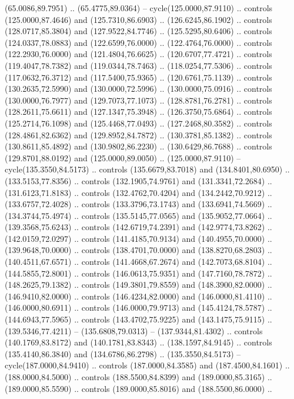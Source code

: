   (65.0086,89.7951) .. (65.4775,89.0364) -- cycle(125.0000,87.9110) .. controls
  (125.0000,87.4646) and (125.7310,86.6903) .. (126.6245,86.1902) .. controls
  (128.0717,85.3804) and (127.9522,84.7746) .. (125.5295,80.6406) .. controls
  (124.0337,78.0883) and (122.6599,76.0000) .. (122.4764,76.0000) .. controls
  (122.2930,76.0000) and (121.4804,76.6625) .. (120.6707,77.4721) .. controls
  (119.4047,78.7382) and (119.0344,78.7463) .. (118.0254,77.5306) .. controls
  (117.0632,76.3712) and (117.5400,75.9365) .. (120.6761,75.1139) .. controls
  (130.2635,72.5990) and (130.0000,72.5996) .. (130.0000,75.0916) .. controls
  (130.0000,76.7977) and (129.7073,77.1073) .. (128.8781,76.2781) .. controls
  (128.2611,75.6611) and (127.1347,75.3948) .. (126.3750,75.6864) .. controls
  (125.2714,76.1098) and (125.4468,77.0493) .. (127.2468,80.3582) .. controls
  (128.4861,82.6362) and (129.8952,84.7872) .. (130.3781,85.1382) .. controls
  (130.8611,85.4892) and (130.9802,86.2230) .. (130.6429,86.7688) .. controls
  (129.8701,88.0192) and (125.0000,89.0050) .. (125.0000,87.9110) --
  cycle(135.3550,84.5173) .. controls (135.6679,83.7018) and (134.8401,80.6950)
  .. (133.5153,77.8356) .. controls (132.1905,74.9761) and (131.3341,72.2684) ..
  (131.6123,71.8183) .. controls (132.4762,70.4204) and (134.2442,70.9212) ..
  (133.6757,72.4028) .. controls (133.3796,73.1743) and (133.6941,74.5669) ..
  (134.3744,75.4974) .. controls (135.5145,77.0565) and (135.9052,77.0664) ..
  (139.3568,75.6243) .. controls (142.6719,74.2391) and (142.9774,73.8262) ..
  (142.0159,72.0297) .. controls (141.4185,70.9134) and (140.4955,70.0000) ..
  (139.9648,70.0000) .. controls (138.4701,70.0000) and (138.8270,68.2803) ..
  (140.4511,67.6571) .. controls (141.4668,67.2674) and (142.7073,68.8104) ..
  (144.5855,72.8001) .. controls (146.0613,75.9351) and (147.7160,78.7872) ..
  (148.2625,79.1382) .. controls (149.3801,79.8559) and (148.3900,82.0000) ..
  (146.9410,82.0000) .. controls (146.4234,82.0000) and (146.0000,81.4110) ..
  (146.0000,80.6911) .. controls (146.0000,79.9713) and (145.4124,78.5787) ..
  (144.6943,77.5965) .. controls (143.4702,75.9225) and (143.1475,75.9115) ..
  (139.5346,77.4211) -- (135.6808,79.0313) -- (137.9344,81.4302) .. controls
  (140.1769,83.8172) and (140.1781,83.8343) .. (138.1597,84.9145) .. controls
  (135.4140,86.3840) and (134.6786,86.2798) .. (135.3550,84.5173) --
  cycle(187.0000,84.9410) .. controls (187.0000,84.3585) and (187.4500,84.1601)
  .. (188.0000,84.5000) .. controls (188.5500,84.8399) and (189.0000,85.3165) ..
  (189.0000,85.5590) .. controls (189.0000,85.8016) and (188.5500,86.0000) ..

